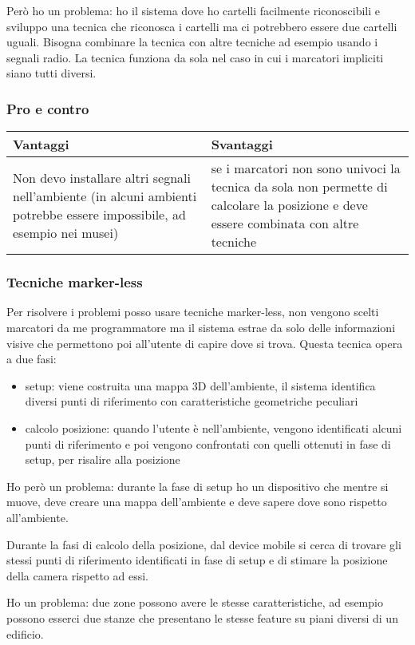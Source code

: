 Però ho un problema: ho il sistema dove ho cartelli facilmente riconoscibili e sviluppo una tecnica che riconosca i cartelli ma ci potrebbero essere due cartelli uguali. 
Bisogna combinare la tecnica con altre tecniche ad esempio usando i segnali radio. 
La tecnica funziona da sola nel caso in cui i marcatori impliciti siano tutti diversi. 

\subsubsection{Pro e contro}
\begin{table}[!ht]
    \centering
    \begin{tabular}{p{}|p{}}
        \textbf{Vantaggi} & \textbf{Svantaggi} \\
        \hline
        Non devo installare altri segnali nell'ambiente (in alcuni ambienti potrebbe essere impossibile, ad esempio nei musei) & se i marcatori non sono univoci la tecnica da sola non permette di calcolare la posizione e deve essere combinata con altre tecniche
    \end{tabular}
\end{table}

\subsubsection{Tecniche marker-less}
Per risolvere i problemi posso usare tecniche marker-less, non vengono scelti marcatori da me programmatore ma il sistema estrae da solo delle informazioni visive che permettono poi all'utente di capire dove si trova.
Questa tecnica opera a due fasi:
\begin{itemize}
    \item setup: viene costruita una mappa 3D dell'ambiente, il sistema identifica diversi punti di riferimento con caratteristiche geometriche peculiari
    \item calcolo posizione: quando l'utente è nell'ambiente, vengono identificati alcuni punti di riferimento e poi vengono confrontati con quelli ottenuti in fase di setup, per risalire alla posizione
\end{itemize}

Ho però un problema: durante la fase di setup ho un dispositivo che mentre si muove, deve creare una mappa dell'ambiente e deve sapere dove sono rispetto all'ambiente. 

Durante la fasi di calcolo della posizione, dal device mobile si cerca di trovare gli stessi punti di riferimento identificati in fase di setup e di stimare la posizione della camera rispetto ad essi. 

Ho un problema: due zone possono avere le stesse caratteristiche, ad esempio possono esserci due stanze che presentano le stesse feature su piani diversi di un edificio.


